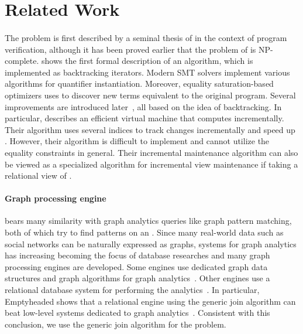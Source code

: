 \section{Related Work}
\label{sec:relatedworks}

\paragraph{\Ematching}

The \ematching problem is first described by a seminal thesis of
 \citet{nelson-thesis} in the context of program verification,
 although it has been proved earlier that the problem
 of \ematching is NP-complete.
\citet{simplify} shows the first formal description of
 an \ematching algorithm, which is implemented as
 backtracking iterators.
Modern SMT solvers implement various \ematching algorithms
 for quantifier instantiation.
Moreover, equality saturation-based optimizers uses \ematching to discover
 new terms equivalent to the original program.
Several improvements are introduced
 later~\cite{moskal, efficient-ematching},
 all based on the idea of backtracking.
In particular, \citet{efficient-ematching} describes an
 efficient \ematching virtual machine that computes
 \ematching incrementally.
Their algorithm uses several indices to track changes
 incrementally and speed up \ematching.
However, their algorithm is difficult to implement and
 cannot utilize the equality constraints in general.
Their incremental maintenance algorithm can also be viewed
 as a specialized algorithm for incremental view maintenance
 if taking a relational view of \egraphs.

\paragraph{Graph processing engine}

\Ematching bears many similarity with graph analytics queries
 like graph pattern matching, both of which try to find patterns
 on an \egraph.
Since many real-world data such as social networks
 can be naturally expressed as graphs, systems for graph analytics
 has increasing becoming the focus of database researches
 and many graph processing engines are developed.
Some engines use dedicated graph data structures and
 graph algorithms for graph analytics~\cite{ligra, snap, powergraph}.
Other engines use a relational database system
 for performing the analytics~\cite{socialite,grail,emptyheaded}.
In particular, Emptyheaded shows that a relational engine using
 the generic join algorithm can beat low-level systems dedicated
 to graph analytics~\cite{emptyheaded}.
Consistent with this conclusion, we use the generic join algorithm for
 the \ematching problem.


